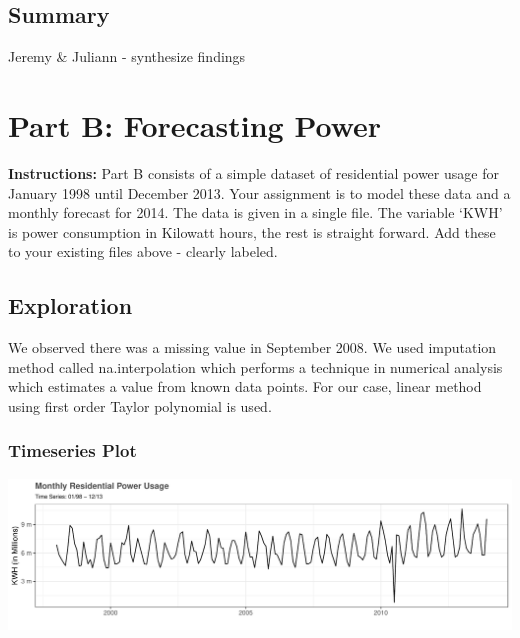 \documentclass[openany]{book}
\renewenvironment{quote}{\begin{myquote}}{\end{myquote}}
\begin{document}
\hypertarget{summary}{%
\section{Summary}\label{summary}}

Jeremy \& Juliann - synthesize findings

\hypertarget{part-b-forecasting-power}{%
\chapter{Part B: Forecasting Power}\label{part-b-forecasting-power}}

\begin{quote}
\textbf{Instructions:} Part B consists of a simple dataset of
residential power usage for January 1998 until December 2013. Your
assignment is to model these data and a monthly forecast for 2014. The
data is given in a single file. The variable `KWH' is power consumption
in Kilowatt hours, the rest is straight forward. Add these to your
existing files above - clearly labeled.
\end{quote}

\hypertarget{exploration-1}{%
\section{Exploration}\label{exploration-1}}

We observed there was a missing value in September 2008. We used
imputation method called na.interpolation which performs a technique in
numerical analysis which estimates a value from known data points. For
our case, linear method using first order Taylor polynomial is used.

\hypertarget{timeseries-plot}{%
\subsection{Timeseries Plot}\label{timeseries-plot}}

\includegraphics{Group2_Project1_Fall2019_files/figure-latex/unnamed-chunk-9-1.pdf}
\end{document}
